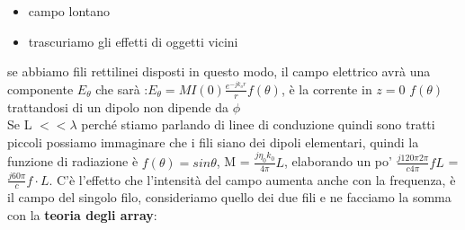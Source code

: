 \documentclass[oneside, 12pt]{extbook}
\begin{document}
\begin{itemize}
	\item campo lontano
	\item trascuriamo gli effetti di oggetti vicini
\end{itemize}
se abbiamo fili rettilinei disposti in questo modo, il campo elettrico avrà una componente $E_{\theta}$ che sarà :$E_{\theta} = M I(0) \frac{e^{-jk_o r}}{r} f(\theta)$, è la corrente in $z = 0$
$f(\theta)$ trattandosi di un dipolo non dipende da $\phi$ \\Se L $<< \lambda$ perché stiamo parlando di linee di conduzione quindi sono tratti piccoli possiamo immaginare che i fili siano dei dipoli elementari, quindi la funzione di radiazione è $f(\theta) = sin \theta$, M = $\frac{j \eta_0 k_0}{4 \pi} L$, elaborando un po' $\frac{j 120\pi 2\pi}{c 4 \pi} fL$ = $\frac{j 60 \pi}{c } f \cdot L$. C'è l'effetto che l'intensità del campo aumenta anche con la frequenza, è il campo del singolo filo, consideriamo quello dei due fili e ne facciamo la somma con la \textbf{teoria degli array}:
\end{document}
